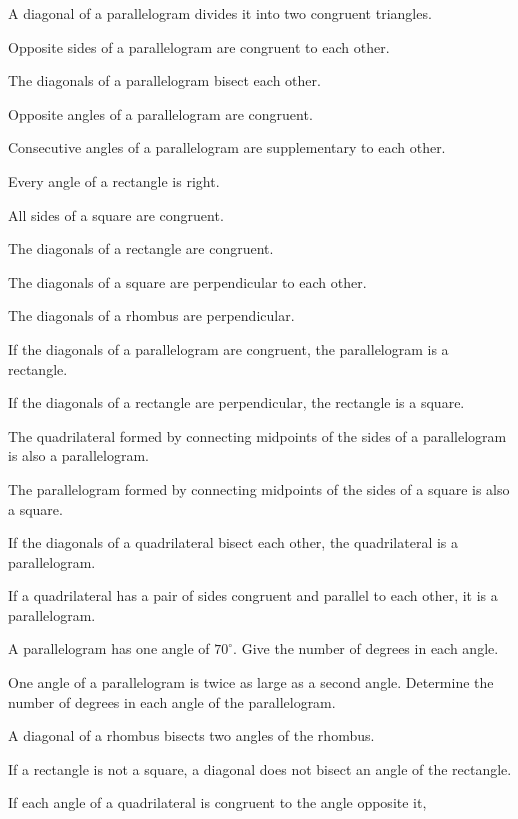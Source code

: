 \documentclass[11pt]{book}
\theoremstyle{bkplain}
\theoremstyle{XIplainnote}
\theoremstyle{bkplain}
\theoremstyle{bkplain}
\begin{document}
\begin{exercisecols}
\begin{exlist}
\item A diagonal of a parallelogram divides it into two congruent triangles.
\item Opposite sides of a parallelogram are congruent to each other.
\item The diagonals of a parallelogram bisect each other.
\item Opposite angles of a parallelogram are congruent.
\item Consecutive angles of a parallelogram are supplementary to each other.
\item Every angle of a rectangle is right.
\item All sides of a square are congruent.
\item The diagonals of a rectangle are congruent.
\item The diagonals of a square are perpendicular to each other.
\item The diagonals of a rhombus are perpendicular.
\item If the diagonals of a parallelogram are congruent, the parallelogram is
  a rectangle.
\item If the diagonals of a rectangle are perpendicular, the rectangle is a
  square.
\item The quadrilateral formed by connecting midpoints of the sides of a
  parallelogram is also a parallelogram.
\item The parallelogram formed by connecting midpoints of the sides of a
  square is also a square.
\item If the diagonals of a quadrilateral bisect each other, the quadrilateral
  is a parallelogram.
\item If a quadrilateral has a pair of sides congruent and parallel to each
  other, it is a parallelogram.
\item A parallelogram has one angle of $70^\circ$. Give the number of degrees
  in each angle.
\item One angle of a parallelogram is twice as large as a second angle.
  Determine the number of degrees in each angle of the parallelogram.
\item A diagonal of a rhombus bisects two angles of the rhombus.
\item If a rectangle is not a square, a diagonal does not bisect an angle of
  the rectangle.
\item If each angle of a quadrilateral is congruent to the angle opposite it,

\end{exlist}
\end{exercisecols}
\end{document}
